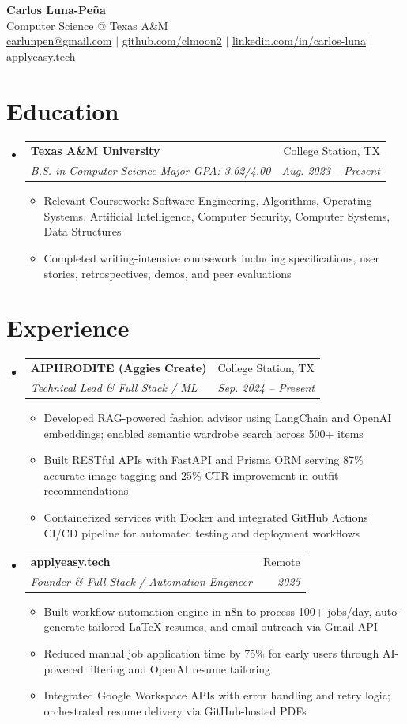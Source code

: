 \documentclass[letterpaper,11pt]{article}
\makeatletter
\newcommand{\resumeItem}[1]{
  \item\small{{#1 \vspace{-2pt}}}
}
\newcommand{\resumeSubheading}[4]{
  \vspace{-2pt}\item
    \begin{tabular*}{0.97\textwidth}[t]{l@{\extracolsep{\fill}}r}
      \textbf{#1} & #2 \\
      \textit{\small#3} & \textit{\small #4} \\
    \end{tabular*}\vspace{-7pt}
}
\newcommand{\resumeSubHeadingListStart}{\begin{itemize}[leftmargin=0.15in, label={}]}
\newcommand{\resumeSubHeadingListEnd}{\end{itemize}}
\newcommand{\resumeItemListStart}{\begin{itemize}}
\newcommand{\resumeItemListEnd}{\end{itemize}\vspace{-5pt}}
\makeatother
\begin{document}
\begin{center}
  \textbf{\Huge Carlos Luna-Pe\~na} \\
  \small Computer Science @ Texas A\&M \\
  \href{mailto:carlunpen@gmail.com}{carlunpen@gmail.com} $|$
  \href{https://github.com/clmoon2}{github.com/clmoon2} $|$
  \href{https://linkedin.com/in/carlos-luna}{linkedin.com/in/carlos-luna} $|$
  \href{https://applyeasy.tech}{applyeasy.tech}
\end{center}

\section{Education}
\resumeSubHeadingListStart
  \resumeSubheading
    {Texas A\&M University}{College Station, TX}
    {B.S. in Computer Science \textbullet{} Major GPA: 3.62/4.00}{Aug. 2023 -- Present}
    \resumeItemListStart
      \resumeItem{Relevant Coursework: Software Engineering, Algorithms, Operating Systems, Artificial Intelligence, Computer Security, Computer Systems, Data Structures}
      \resumeItem{Completed writing-intensive coursework including specifications, user stories, retrospectives, demos, and peer evaluations}
    \resumeItemListEnd
\resumeSubHeadingListEnd

\section{Experience}
\resumeSubHeadingListStart
  \resumeSubheading
    {AIPHRODITE (Aggies Create)}{College Station, TX}
    {Technical Lead \& Full Stack / ML}{Sep. 2024 -- Present}
    \resumeItemListStart
      \resumeItem{Developed RAG-powered fashion advisor using LangChain and OpenAI embeddings; enabled semantic wardrobe search across 500+ items}
      \resumeItem{Built RESTful APIs with FastAPI and Prisma ORM serving 87\% accurate image tagging and 25\% CTR improvement in outfit recommendations}
      \resumeItem{Containerized services with Docker and integrated GitHub Actions CI/CD pipeline for automated testing and deployment workflows}
    \resumeItemListEnd

  \resumeSubheading
    {applyeasy.tech}{Remote}
    {Founder \& Full-Stack / Automation Engineer}{2025}
    \resumeItemListStart
      \resumeItem{Built workflow automation engine in n8n to process 100+ jobs/day, auto-generate tailored LaTeX resumes, and email outreach via Gmail API}
      \resumeItem{Reduced manual job application time by 75\% for early users through AI-powered filtering and OpenAI resume tailoring}
      \resumeItem{Integrated Google Workspace APIs with error handling and retry logic; orchestrated resume delivery via GitHub-hosted PDFs}
    \resumeItemListEnd
\resumeSubHeadingListEnd
\end{document}
